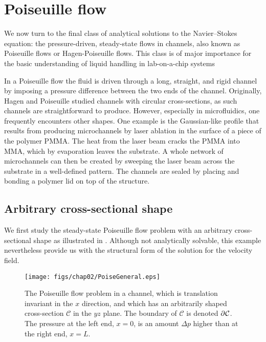 \section{Poiseuille flow}

We now turn to the final class of analytical solutions to the
Navier--Stokes equation: the pressure-driven, steady-state flows
in channels, also known as Poiseuille flows or Hagen-Poiseuille
flows.  This class is of major importance for the basic
understanding of liquid handling in lab-on-a-chip systems



In a Poiseuille flow the fluid is driven through a long, straight,
and rigid channel by imposing a pressure difference between the
two ends of the channel. Originally, Hagen and Poiseuille studied
channels with circular cross-sections, as such channels are
straightforward to produce. However, especially in microfluidics,
one frequently encounters other shapes. One example is the
Gaussian-like profile that results from producing microchannels by
laser ablation in the surface of a piece of the polymer PMMA. The
heat from the laser beam cracks the PMMA into MMA, which by
evaporation leaves the substrate. A whole network of microchannels
can then be created by sweeping  the laser beam across the
substrate in a well-defined pattern. The channels are sealed by
placing and bonding a polymer lid on top of the structure.


\subsection{Arbitrary cross-sectional shape}

We first study the steady-state Poiseuille flow problem with an
arbitrary cross-sectional shape as illustrated in
. Although not analytically solvable, this
example nevertheless provide us with the structural form of the
solution for the velocity field.

\begin{figure}
\centerline{
  \texttt{[image: figs/chap02/PoiseGeneral.eps]}}
\caption[Poiseuille flow: arbitrary
cross-section]{ The Poiseuille flow problem
in a channel, which is translation invariant in the $x$ direction,
and which has an arbitrarily shaped cross-section $\mathcal{C}$ in
the $yz$ plane. The boundary of $\mathcal{C}$ is denoted $\partial^{{}}
\mathcal{C}$. The pressure at the left end, $x = 0$, is an amount
$\Delta p$ higher than at the right end, $x = L$.}
\end{figure}


